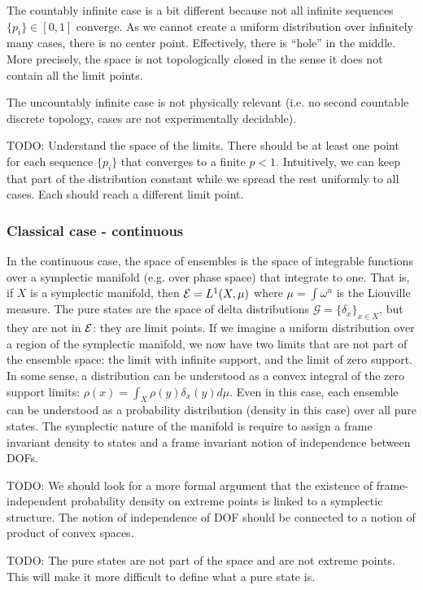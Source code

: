 The countably infinite case is a bit different because not all infinite sequences $\{p_i\} \in [0,1]$ converge. As we cannot create a uniform distribution over infinitely many cases, there is no center point. Effectively, there is ``hole'' in the middle. More precisely, the space is not topologically closed in the sense it does not contain all the limit points.

The uncountably infinite case is not physically relevant (i.e. no second countable discrete topology, cases are not experimentally decidable).

TODO: Understand the space of the limits. There should be at least one point for each sequence $\{p_i\}$ that converges to a finite $p < 1$. Intuitively, we can keep that part of the distribution constant while we spread the rest uniformly to all cases. Each should reach a different limit point.

\subsubsection{Classical case - continuous}

In the continuous case, the space of ensembles is the space of integrable functions over a symplectic manifold (e.g.  over phase space) that integrate to one. That is, if $X$ is a symplectic manifold, then $\mathcal{E} = L^1(X, \mu)$ where $\mu=\int \omega^n$ is the Liouville measure. The pure states are the space of delta distributions $\mathcal{G} = \{\delta_x\}_{x \in X}$, but they are not in  $\mathcal{E}$: they are limit points. If we imagine a uniform distribution over a region of the symplectic manifold, we now have two limits that are not part of the ensemble space: the limit with infinite support, and the limit of zero support. In some sense, a distribution can be understood as a convex integral of the zero support limits: $\rho(x) = \int_X \rho(y) \delta_x(y) d\mu$. Even in this case, each ensemble can be understood as a probability distribution (density in this case) over all pure states. The symplectic nature of the manifold is require to assign a frame invariant density to states and a frame invariant notion of independence between DOFs.

TODO: We should look for a more formal argument that the existence of frame-independent probability density on extreme points is linked to a symplectic structure. The notion of independence of DOF should be connected to a notion of product of convex spaces.

TODO: The pure states are not part of the space and are not extreme points. This will make it more difficult to define what a pure state is.


